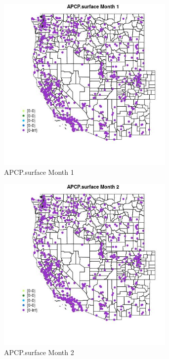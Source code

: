 \begin{figure} 
\centering  
\includegraphics[width=0.77\textwidth]{Code_Outputs/Report_ML_input_PM25_Step4_part_f_de_duplicated_aveswNAs_MapObsMo1APCPsurface.jpg} 
\caption{\label{fig:Report_ML_input_PM25_Step4_part_f_de_duplicated_aveswNAsMapObsMo1APCPsurface}APCP.surface Month 1} 
\end{figure} 
 

\clearpage 

\begin{figure} 
\centering  
\includegraphics[width=0.77\textwidth]{Code_Outputs/Report_ML_input_PM25_Step4_part_f_de_duplicated_aveswNAs_MapObsMo2APCPsurface.jpg} 
\caption{\label{fig:Report_ML_input_PM25_Step4_part_f_de_duplicated_aveswNAsMapObsMo2APCPsurface}APCP.surface Month 2} 
\end{figure} 
 

